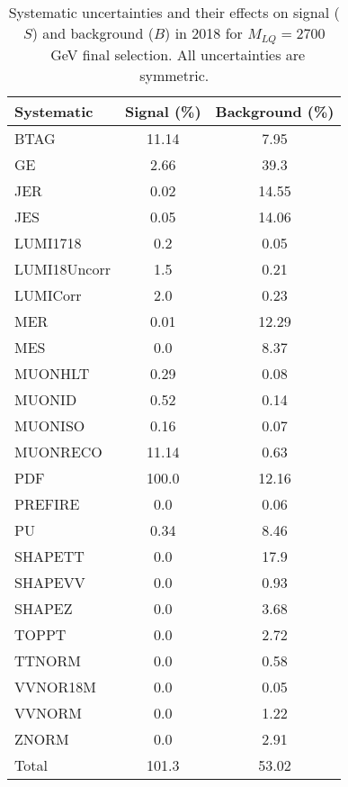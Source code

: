 \begin{table}[htbp]
\begin{center}
\caption{Systematic uncertainties and their effects on signal ($S$) and background ($B$) in 2018 for $M_{LQ}=2700$~GeV final selection. All uncertainties are symmetric.}
\begin{tabular}{lcc}
\hline\hline
Systematic & Signal (\%) & Background (\%) \\ \hline 
BTAG & 11.14 & 7.95\\ 
GE & 2.66 & 39.3\\ 
JER & 0.02 & 14.55\\ 
JES & 0.05 & 14.06\\ 
LUMI1718 & 0.2 & 0.05\\ 
LUMI18Uncorr & 1.5 & 0.21\\ 
LUMICorr & 2.0 & 0.23\\ 
MER & 0.01 & 12.29\\ 
MES & 0.0 & 8.37\\ 
MUONHLT & 0.29 & 0.08\\ 
MUONID & 0.52 & 0.14\\ 
MUONISO & 0.16 & 0.07\\ 
MUONRECO & 11.14 & 0.63\\ 
PDF & 100.0 & 12.16\\ 
PREFIRE & 0.0 & 0.06\\ 
PU & 0.34 & 8.46\\ 
SHAPETT & 0.0 & 17.9\\ 
SHAPEVV & 0.0 & 0.93\\ 
SHAPEZ & 0.0 & 3.68\\ 
TOPPT & 0.0 & 2.72\\ 
TTNORM & 0.0 & 0.58\\ 
VVNOR18M & 0.0 & 0.05\\ 
VVNORM & 0.0 & 1.22\\ 
ZNORM & 0.0 & 2.91\\ 
Total & 101.3 & 53.02\\ \hline \hline
\end{tabular}
\label{tab:SysUncertainties_uujj_2700}
\end{center}
\end{table}

